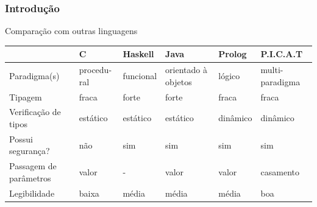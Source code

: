 \documentclass[sans]{beamer}
\begin{document}

\begin{frame}[fragile]   %
\frametitle{Introdução}
\begin{block}{Comparação com outras linguagens}
\begin{table}[!bh]
\centering
\label{tabela_ling_refs}
{\small
\begin{tabular}{p{2cm}|p{1.45cm}|p{1.45cm}|p{1.45cm}|p{1.45cm}|p{1.45cm}}\hline \hline
      &\textbf{C}  &  \textbf{Haskell} &  \textbf{Java} &  \textbf{Prolog} &  \textbf{P.I.C.A.T}\\ \hline \hline
	    
Paradigma(s)	                        & procedu-ral                                    & funcional                               & orientado à objetos   &  lógico                                             & multi-paradigma \\
\hline 

Tipagem	        & fraca                                         & forte                                   & forte                  &  fraca                                                         & fraca \\
\hline 

Verificação de tipos	                & estático                                      & estático                                & estático                              & dinâmico                                   & dinâmico \\

\hline  
Possui segurança?	                & não                                             & sim                                      & sim                                            & sim                                          & sim\\

\hline  
Passagem de parâmetros	                &  valor & -                                       &  valor                                     &  valor & casamento \\

\hline   
Legibilidade	  & baixa   & média     & média &  média       & boa \\


\hline 
\hline
\end{tabular} 
}

\end{table}
\end{block}
\end{frame}
\end{document}

